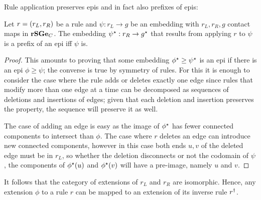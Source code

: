 Rule application preserves epis
and in fact also prefixes of epis:
\begin{lemma}
  \label{lemma:epi-prefix}
  Let $r = \left(r_L,r_R\right)$ be a rule
  and $\psi: r_L \to g$ be an embedding
  with $r_L,r_R,g$ contact maps in $\mathbf{rSGe}_C$.
  The embedding $\psi^\star: r_R \to g^\star$
  that results from applying $r$ to $\psi$
  is a prefix of an epi iff $\psi$ is.
\end{lemma}
\begin{proof}
  This amounts to proving that
  some embedding $\phi^\star \geq \psi^\star$
  is an epi if there is an epi $\phi \geq \psi$;
  the converse is true by symmetry of rules.
  For this it is enough to consider the case
  where the rule adds or deletes exactly one edge
  since rules that modify more than one edge at a time
  can be decomposed as sequences of deletions and insertions of edges;
  given that each deletion and insertion preserves the property,
  the sequence will preserve it as well.

  The case of adding an edge is easy as the image of $\phi^\star$
  has fewer connected components to intersect than $\phi$.
  The case where $r$ deletes an edge
  can introduce new connected components,
  however in this case both ends $u,v$
  of the deleted edge must be in $r_L$,
  so whether the deletion disconnects or not the codomain of $\psi$,
  the components of $\phi^\star(u)$ and $\phi^\star(v)$
  will have a pre-image, namely $u$ and $v$.
\end{proof}

It follows that the category of extensions
of $r_L$ and $r_R$ are isomorphic.
Hence, any extension $\phi$ to a rule $r$ can be mapped to
an extension of its inverse rule $r^\dagger$.

